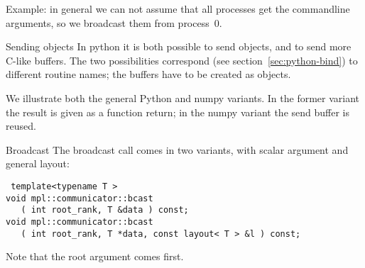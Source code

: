 Example: in general we can not assume that all processes get the
commandline arguments, so we broadcast them from process~0.


\begin{comment}
  \begin{exercise}
    \label{ex:argv-bcast}
    If you give a commandline argument to a program, that argument is available
    as a character string as part of the \n{argv,argc} pair that you typically use
    as the arguments to your main program. You can use the function \n{atoi} to
    convert such a string to integer.

    Write a program where process~0 looks for an integer on the commandline, and
    broadcasts it to the other processes. Initialize the buffer on all processes, and
    let all processes print out the broadcast number,
    just to check that you solved the problem correctly.
  \end{exercise}
\end{comment}

\begin{pythonnote}{Sending objects}
  In python it is both possible to send objects, and to send more
  C-like buffers. The two possibilities correspond (see
  section~\ref{sec:python-bind}) to different routine names; the
  buffers have to be created as  objects.

  We illustrate both the general Python and numpy variants. 
  In the former variant the result is given as a function return;
  in the numpy variant the send buffer is reused.

\end{pythonnote}

\begin{mplnote}{Broadcast}
  The broadcast call comes in two variants, with scalar argument
  and general layout:
\begin{lstlisting}
 template<typename T >
void mpl::communicator::bcast
   ( int root_rank, T &data ) const;
void mpl::communicator::bcast
   ( int root_rank, T *data, const layout< T > &l ) const;
\end{lstlisting}
  Note that the root argument comes first.
\end{mplnote}

